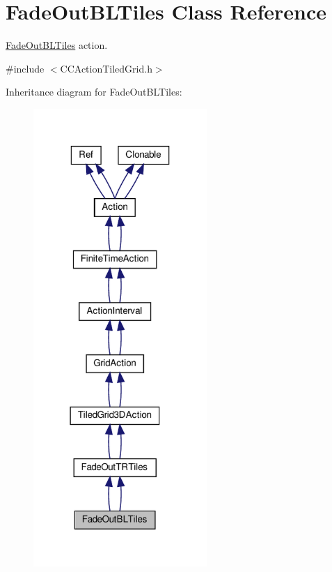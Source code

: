\hypertarget{classFadeOutBLTiles}{}\section{Fade\+Out\+B\+L\+Tiles Class Reference}
\label{classFadeOutBLTiles}


\hyperlink{classFadeOutBLTiles}{Fade\+Out\+B\+L\+Tiles} action.  




{\ttfamily \#include $<$C\+C\+Action\+Tiled\+Grid.\+h$>$}



Inheritance diagram for Fade\+Out\+B\+L\+Tiles\+:
\nopagebreak
\begin{figure}[H]
\begin{center}
\leavevmode
\includegraphics[width=187pt]{classFadeOutBLTiles__inherit__graph}
\end{center}
\end{figure}


